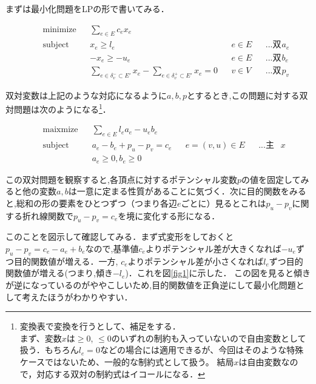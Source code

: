 \documentclass[13pt]{jarticle}
\theoremstyle{nonitalic} %
\begin{document}
まずは最小化問題をLPの形で書いてみる．

\begin{align}
 &&&&&\textrm{minimize}   && \sum_{e\in E} c_e x_e  \\
 &&&&&\textrm{subject to} && x_{e} \geq l_e & &e  \in E && \textrm{...双対変数$a_e$} \\
 &&&&& && -x_{e} \geq -u_e && e \in E && \textrm{...双対変数$b_e$}\\
 &&&&&                    && \sum_{e \in \delta_v^-  \subset E'} x_e - \sum_{e \in \delta_v^+  \subset E'} x_e= 0 && v \in V && \textrm{...双対変数$p_v$} &&&&& 
\end{align}

双対変数は上記のような対応になるように$a,b,p$とするとき,この問題に対する双対問題は次のようになる\footnote{
変換表で変換を行うとして、補足をする．　\\
まず、変数$x$は$\geq 0$, $\leq 0$のいずれの制約も入っていないので自由変数として扱う．もちろん$l_e=0$などの場合には適用できるが、今回はそのような特殊ケースではないため、一般的な制約式として扱う。 結局$x$は自由変数なので，対応する双対の制約式はイコールになる．}．

\begin{align}
&&&&&\textrm{maixmize}   && \sum_{e\in E} l_e a_e - u_e b_e  \\
&&&&&\textrm{subject to} && a_e - b_e + p_u - p_v = c_e && e = (v,u) \in E  && \textrm{...主変数$x$}& \\
&&&&& && a_e \geq 0, b_e \geq 0 &&&&&&&&
\end{align}

この双対問題を観察すると,各頂点に対するポテンシャル変数$p$の値を固定してみると他の変数$a,b$は一意に定まる性質があることに気づく．次に目的関数をみると,総和の形の要素をひとつずつ（つまり各辺$e$ごとに）見るとこれは$p_u-p_v$に関する折れ線関数で$p_u-p_v=c_e$を境に変化する形になる．

このことを図示して確認してみる．まず式変形をしておくと$p_u-p_v = c_e - a_e + b_e$なので,基準値$c_e$よりポテンシャル差が大きくなれば$-u_e$ずつ目的関数値が増える．一方, $c_e$よりポテンシャル差が小さくなれば$l_e$ずつ目的関数値が増える(つまり,傾き$-l_e$)．これを図\ref{fig1}に示した． この図を見ると傾きが逆になっているのがややこしいため,目的関数値を正負逆にして最小化問題として考えたほうがわかりやすい．
\end{document}
